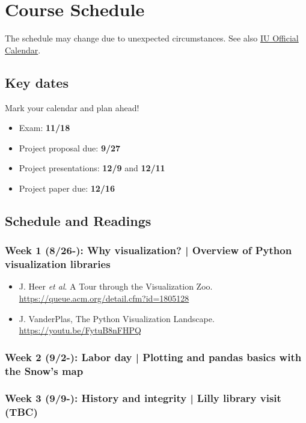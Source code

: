 \documentclass[11pt,article,oneside]{memoir} %
\begin{document}
\clearpage\section{Course Schedule}%

The schedule may change due to unexpected circumstances. See also \href{https://registrar.indiana.edu/official-calendar/index.shtml}{IU Official Calendar}. 

\subsection{Key dates}\label{sub:key_dates} %

Mark your calendar and plan ahead!

\begin{itemize}%
\item Exam: \textbf{11/18}
\item Project proposal due: \textbf{9/27}
\item Project presentations: \textbf{12/9} and \textbf{12/11}
\item Project paper due: \textbf{12/16}
\end{itemize} %

\subsection{Schedule and Readings}\label{sub:schedule}%

\subsubsection{Week 1 (8/26-): Why visualization? | Overview of Python visualization libraries} %

\begin{itemize}\itemsep0em 
\item J. Heer \emph{et al}. A Tour through the Visualization Zoo. \url{https://queue.acm.org/detail.cfm?id=1805128}
\item J. VanderPlas, The Python Visualization Landscape. \url{https://youtu.be/FytuB8nFHPQ}
\end{itemize}	
\subsubsection{Week 2 (9/2-): Labor day | Plotting and pandas basics with the Snow's map }%

\subsubsection{Week 3 (9/9-): History and integrity | Lilly library visit (TBC) }%
\end{document}
